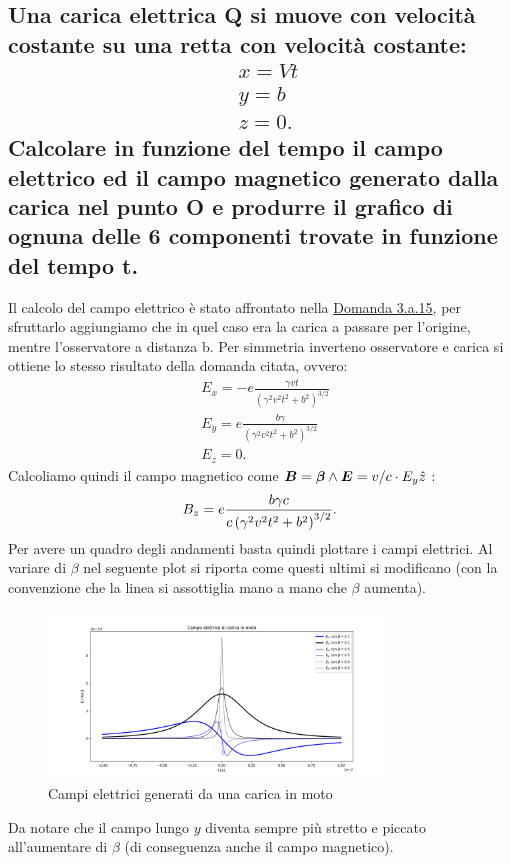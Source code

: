 \subsection[]{Una carica elettrica Q si muove con velocità costante su una retta con velocità costante:
\begin{align*}
	 &x=Vt \\
	 &y=b \\ 
	 &z=0
.\end{align*}
Calcolare in funzione del tempo il campo elettrico ed il campo magnetico generato dalla carica nel punto O e produrre il grafico di ognuna delle 6 componenti trovate in funzione del tempo t.}
\label{sec:3.b.6}
Il calcolo del campo elettrico è stato affrontato nella \hyperref[sec:3.a.15]{Domanda 3.a.15}, per sfruttarlo aggiungiamo che in quel caso era la carica a passare per l'origine, mentre l'osservatore a distanza b. Per simmetria inverteno osservatore e carica si ottiene lo stesso risultato della domanda citata, ovvero:
\begin{align*}
	&E_x = -e \frac{\gamma vt}{\left( \gamma^2v^2t^2 + b^2 \right)^{3 /2} }\\
	&E_y = e \frac{b\gamma }{\left( \gamma^2v^2t^2 + b^2 \right)^{3 /2}}\\
	&E_z = 0
.\end{align*}
Calcoliamo quindi il campo magnetico come $\boldsymbol{B}= \boldsymbol{\beta}\wedge \boldsymbol{E}=v/c \cdot E_{y} \hat{z}$ :
\[
	B_z = e \frac{b\gamma c}{c\left( \gamma^2v^2t^2 + b^2 \right)^{3 /2}}\\
.\] 
Per avere un quadro degli andamenti basta quindi plottare i campi elettrici. Al variare di $\beta$ nel seguente plot si riporta come questi ultimi si modificano (con la convenzione che la linea si assottiglia mano a mano che $\beta$ aumenta).
\begin{figure}[H]
	\centering
	\includegraphics[width=0.8\textwidth]{immagini/carica_in_moto.png}
	\caption{Campi elettrici generati da una carica in moto}
	\label{fig:campo_carica_moto}
\end{figure}
Da notare che il campo lungo $y$ diventa sempre più stretto e piccato all'aumentare di $\beta$ (di conseguenza anche il campo magnetico).


